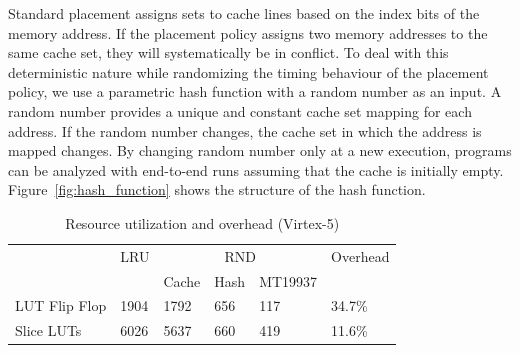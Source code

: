 Standard placement assigns sets to cache lines based on the index bits
of the memory address. If the placement policy assigns two memory
addresses to the same cache set, they will systematically be in conflict. 
To deal with this deterministic nature while randomizing the timing
behaviour of the placement policy, we use a parametric hash
function with a random number as an input.  A random number
provides a unique and constant cache set mapping for each address.
If the random number changes, the cache set in which the address is mapped changes. By changing random number only at a new execution, programs can be analyzed with end-to-end runs assuming that the cache is initially empty.
Figure~\ref{fig:hash_function} shows the structure of the hash function.






%




\begin{table}[t]
\caption{Resource utilization and overhead (Virtex-5)}
\label{resource_table}
\begin{center}
\begin{tabular}{llllll}
\toprule
              & LRU & \multicolumn{3}{c}{RND} & Overhead \\
\cmidrule(lr){3-5}
              &   &  Cache & Hash	& MT19937 &  \\
\midrule
LUT Flip Flop  & 1904    &  1792   &  656   &  117  & 34.7\% \\ 
Slice LUTs     & 6026    &  5637   &  660   &  419  & 11.6\%  \\
\bottomrule
\end{tabular}
\end{center}
\end{table}


